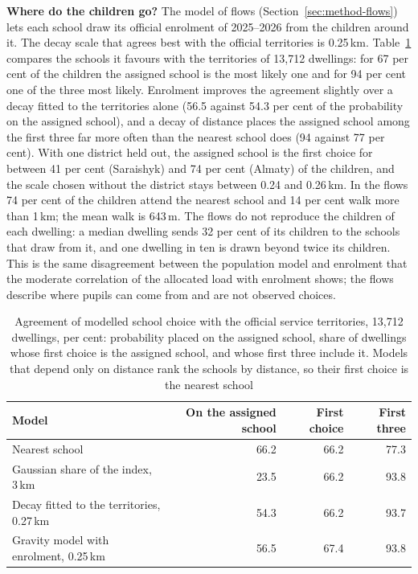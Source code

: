 \textbf{Where do the children go?} The model of flows (Section~\ref{sec:method-flows}) lets each school draw its official enrolment of 2025--2026 from the children around it. The decay scale that agrees best with the official territories is 0.25\,km. Table~\ref{tab:flows} compares the schools it favours with the territories of 13,712 dwellings: for 67 per cent of the children the assigned school is the most likely one and for 94 per cent one of the three most likely. Enrolment improves the agreement slightly over a decay fitted to the territories alone (56.5 against 54.3 per cent of the probability on the assigned school), and a decay of distance places the assigned school among the first three far more often than the nearest school does (94 against 77 per cent). With one district held out, the assigned school is the first choice for between 41 per cent (Saraishyk) and 74 per cent (Almaty) of the children, and the scale chosen without the district stays between 0.24 and 0.26\,km. In the flows 74 per cent of the children attend the nearest school and 14 per cent walk more than 1\,km; the mean walk is 643\,m. The flows do not reproduce the children of each dwelling: a median dwelling sends 32 per cent of its children to the schools that draw from it, and one dwelling in ten is drawn beyond twice its children. This is the same disagreement between the population model and enrolment that the moderate correlation of the allocated load with enrolment shows; the flows describe where pupils can come from and are not observed choices.

\begin{table}[ht]
\centering
\caption{Agreement of modelled school choice with the official service territories, 13,712 dwellings, per cent: probability placed on the assigned school, share of dwellings whose first choice is the assigned school, and whose first three include it. Models that depend only on distance rank the schools by distance, so their first choice is the nearest school}
\label{tab:flows}
\small
\begin{tabularx}{\textwidth}{>{\raggedright\arraybackslash}Xrrr}
\toprule
Model & On the assigned school & First choice & First three \\
\midrule
Nearest school & 66.2 & 66.2 & 77.3 \\
Gaussian share of the index, 3\,km & 23.5 & 66.2 & 93.8 \\
Decay fitted to the territories, 0.27\,km & 54.3 & 66.2 & 93.7 \\
Gravity model with enrolment, 0.25\,km & 56.5 & 67.4 & 93.8 \\
\bottomrule
\end{tabularx}
\end{table}

